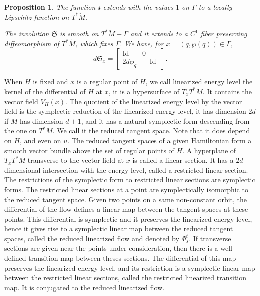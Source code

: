 \documentclass[10pt]{amsart}
\DeclareMathOperator{\Id}{Id}
\newcommand{\gS}{\ensuremath{\mathfrak{S}}}
\newcommand{\ms}{\ensuremath{\mathscr{s}}}
\theoremstyle{plain}
\newtheorem{prop}[lem]{Proposition}
\theoremstyle{definition}
\begin{document}
\begin{prop}\label{prop-sym}
The function $\ms$ extends with the values $1$ on $\Gamma$ to a locally Lipschitz function on $T^*\breve M$.

The involution $\gS$ is smooth on $T^*\breve M-\Gamma$ and it extends to a $C^1$ fiber preserving diffeomorphism of $T^*\breve M$, which fixes $\Gamma$. We have, for $x=(q,\wp(q))\in \Gamma$,
\[
d\gS_{x}=\begin{bmatrix}\Id &0\\2d\wp_q & -\Id\end{bmatrix}.
\]
\end{prop}

When $H$ is fixed and $x$ is a regular point of $H$, we call linearized energy level the kernel of the differential of $H$ at $x$, it is a hypersurface of $T_xT^*M$. It contains the vector field $V_H(x)$. The quotient of the linearized energy level by the vector field is the symplectic reduction of the linearized energy level, it has dimension $2d$ if $M$ has dimension $d+1$, and it
has a natural symplectic form descending from the one on $T^*M$. We call it the reduced tangent space.
Note that it does depend on $H$, and even on $u$. The reduced tangent spaces of a given Hamiltonian form a smooth vector bundle above the set of regular points of $H$. A hyperplane of $T_xT^*M$ transverse to the vector field at $x$ is called a linear section. It has a $2d$ dimensional intersection with the energy level, called a restricted linear section.
The restrictions of the symplectic form to restricted linear sections are symplectic forms.
The restricted linear sections at a point are symplectically isomorphic to the reduced tangent space.
Given two points on a same non-constant orbit, the differential of the flow defines a linear map between the tangent spaces at these points. This differential is symplectic and it preserves the linearized energy level, hence it gives rise to a symplectic linear map between the reduced tangent spaces, called the reduced linearized flow and denoted by $\Phi_s^t$.
If transverse sections are given near the points under consideration, then there is a well defined transition map between theses
sections. The differential of this map preserves the linearized energy level, and its restriction is a symplectic linear map between the restricted linear sections, called the restricted linearized transition map.
It is conjugated to the reduced linearized flow.
\end{document}
